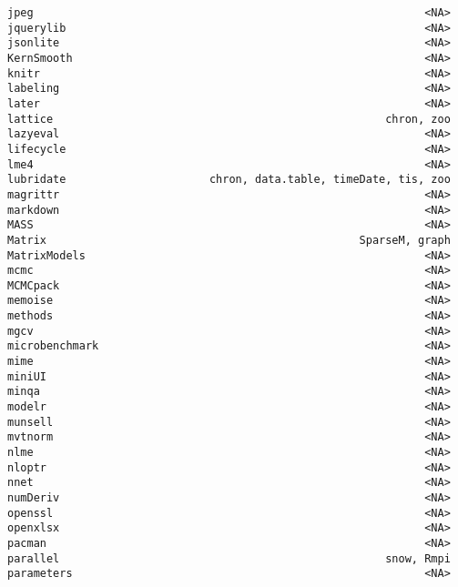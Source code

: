 \documentclass[
  letterpaper,
  DIV=11,
  numbers=noendperiod]{scrreprt}
\begin{document}
\begin{verbatim}
jpeg                                                            <NA>
jquerylib                                                       <NA>
jsonlite                                                        <NA>
KernSmooth                                                      <NA>
knitr                                                           <NA>
labeling                                                        <NA>
later                                                           <NA>
lattice                                                   chron, zoo
lazyeval                                                        <NA>
lifecycle                                                       <NA>
lme4                                                            <NA>
lubridate                      chron, data.table, timeDate, tis, zoo
magrittr                                                        <NA>
markdown                                                        <NA>
MASS                                                            <NA>
Matrix                                                SparseM, graph
MatrixModels                                                    <NA>
mcmc                                                            <NA>
MCMCpack                                                        <NA>
memoise                                                         <NA>
methods                                                         <NA>
mgcv                                                            <NA>
microbenchmark                                                  <NA>
mime                                                            <NA>
miniUI                                                          <NA>
minqa                                                           <NA>
modelr                                                          <NA>
munsell                                                         <NA>
mvtnorm                                                         <NA>
nlme                                                            <NA>
nloptr                                                          <NA>
nnet                                                            <NA>
numDeriv                                                        <NA>
openssl                                                         <NA>
openxlsx                                                        <NA>
pacman                                                          <NA>
parallel                                                  snow, Rmpi
parameters                                                      <NA>

\end{verbatim}
\end{document}
